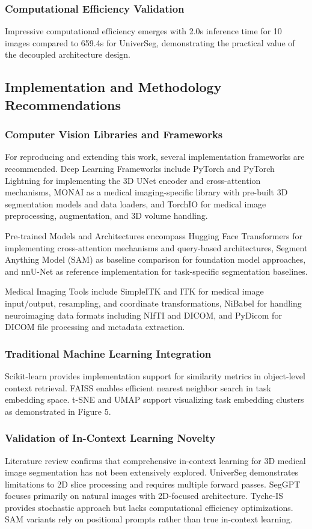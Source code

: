 \subsubsection{Computational Efficiency Validation}
Impressive computational efficiency emerges with 2.0s inference time for 10 images compared to 659.4s for UniverSeg, demonstrating the practical value of the decoupled architecture design.

\subsection{Implementation and Methodology Recommendations}
\subsubsection{Computer Vision Libraries and Frameworks}
For reproducing and extending this work, several implementation frameworks are recommended. Deep Learning Frameworks include PyTorch and PyTorch Lightning for implementing the 3D UNet encoder and cross-attention mechanisms, MONAI as a medical imaging-specific library with pre-built 3D segmentation models and data loaders, and TorchIO for medical image preprocessing, augmentation, and 3D volume handling.

Pre-trained Models and Architectures encompass Hugging Face Transformers for implementing cross-attention mechanisms and query-based architectures, Segment Anything Model (SAM) as baseline comparison for foundation model approaches, and nnU-Net as reference implementation for task-specific segmentation baselines.

Medical Imaging Tools include SimpleITK and ITK for medical image input/output, resampling, and coordinate transformations, NiBabel for handling neuroimaging data formats including NIfTI and DICOM, and PyDicom for DICOM file processing and metadata extraction.

\subsubsection{Traditional Machine Learning Integration}
Scikit-learn provides implementation support for similarity metrics in object-level context retrieval. FAISS enables efficient nearest neighbor search in task embedding space. t-SNE and UMAP support visualizing task embedding clusters as demonstrated in Figure 5.

\subsubsection{Validation of In-Context Learning Novelty}
Literature review confirms that comprehensive in-context learning for 3D medical image segmentation has not been extensively explored. UniverSeg demonstrates limitations to 2D slice processing and requires multiple forward passes. SegGPT focuses primarily on natural images with 2D-focused architecture. Tyche-IS provides stochastic approach but lacks computational efficiency optimizations. SAM variants rely on positional prompts rather than true in-context learning.

